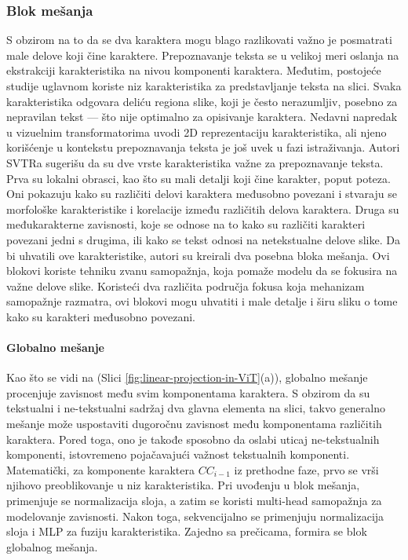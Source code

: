 \documentclass[a4paper,12pt]{article}
\begin{document}
	\subsubsection{Blok mešanja}
	S obzirom na to da se dva karaktera mogu blago razlikovati važno je posmatrati male delove koji čine karaktere. Prepoznavanje teksta se u velikoj meri oslanja na ekstrakciji karakteristika na nivou komponenti karaktera. Međutim, postojeće studije uglavnom koriste niz karakteristika za predstavljanje teksta na slici. Svaka karakteristika odgovara deliću regiona slike, koji je često nerazumljiv, posebno za nepravilan tekst — što nije optimalno za opisivanje karaktera. Nedavni napredak u vizuelnim transformatorima uvodi 2D reprezentaciju karakteristika, ali njeno korišćenje u kontekstu prepoznavanja teksta je još uvek u fazi istraživanja. Autori SVTRa sugerišu da su dve vrste karakteristika važne za prepoznavanje teksta. Prva su lokalni obrasci, kao što su mali detalji koji čine karakter, poput poteza. Oni pokazuju kako su različiti delovi karaktera međusobno povezani i stvaraju se morfološke karakteristike i korelacije između različitih delova karaktera. Druga su međukarakterne zavisnosti, koje se odnose na to kako su različiti karakteri povezani jedni s drugima, ili kako se tekst odnosi na netekstualne delove slike. Da bi uhvatili ove karakteristike, autori su kreirali dva posebna bloka mešanja. Ovi blokovi koriste tehniku zvanu samopažnja, koja pomaže modelu da se fokusira na važne delove slike. Koristeći dva različita područja fokusa koja mehanizam samopažnje razmatra, ovi blokovi mogu uhvatiti i male detalje i širu sliku o tome kako su karakteri međusobno povezani.
	
	\paragraph{Globalno mešanje}
	Kao što se vidi na (Slici \ref{fig:linear-projection-in-ViT}(a)), globalno mešanje procenjuje zavisnost među svim komponentama karaktera. S obzirom da su tekstualni i ne-tekstualni sadržaj dva glavna elementa na slici, takvo generalno mešanje može uspostaviti dugoročnu zavisnost među komponentama različitih karaktera. Pored toga, ono je takođe sposobno da oslabi uticaj ne-tekstualnih komponenti, istovremeno pojačavajući važnost tekstualnih komponenti. Matematički, za komponente karaktera \(CC_{i-1}\) iz prethodne faze, prvo se vrši njihovo preoblikovanje u niz karakteristika. Pri uvođenju u blok mešanja, primenjuje se normalizacija sloja, a zatim se koristi multi-head samopažnja za modelovanje zavisnosti. Nakon toga, sekvencijalno se primenjuju normalizacija sloja i MLP za fuziju karakteristika.  Zajedno sa prečicama, formira se blok globalnog mešanja.
	
\end{document}
